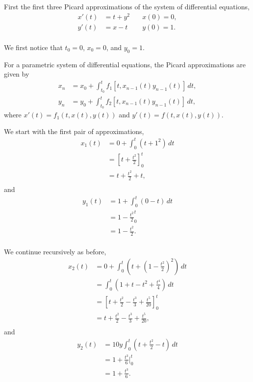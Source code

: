 \documentclass[../hw5]{subfiles}
\begin{document}
First the first three Picard approximations of the system of differential equations,
\begin{align*}
    x'(t)&=t+y^2\quad &x(0)=0, \\
    y'(t)&=x-t\quad &y(0)=1. \\
\end{align*}

We first notice that $t_0=0$, $x_0=0$, and $y_0=1$.

For a parametric system of differential equations, the Picard approximations are given by
\begin{align*}
    x_n&=x_0+\int_{t_0}^{t}f_1[t,x_{n-1}(t)y_{n-1}(t)]\,dt, \\
    y_n&=y_0+\int_{t_0}^{t}f_2[t,x_{n-1}(t)y_{n-1}(t)]\,dt,
\end{align*} 
where $x'(t)=f_1(t,x(t),y(t))$ and $y'(t)=f(t,x(t),y(t))$.

We start with the first pair of approximations,
\begin{align*}
    x_1(t)&=0+\int_{0}^{t}(t+1^2)\,dt \\
    &={\left[ t+\frac{t^2}{2} \right]}_{0}^{t} \\
    &=t+\frac{t^2}{2}+t, \\
\end{align*}
and
\begin{align*}
    y_1(t)&=1+\int_{0}^{t}(0-t)\,dt \\
    &=1-{\frac{t^2}{2}}_{0}^{t} \\
    &=1-\frac{t^2}{2}. \\
\end{align*}

We continue recursively as before, 
\begin{align*}
    x_2(t)&=0+\int_{0}^{t}\left( t+{\left( 1-\frac{t^2}{2} \right)}^2 \right)\,dt \\
    &=\int_{0}^{t} \left( 1+t-t^2+\frac{t^4}{4} \right)\,dt \\
    &= {\left[ t+\frac{t^2}{2}-\frac{t^3}{3}+\frac{t^5}{20} \right]}_{0}^{t} \\
    &= t+\frac{t^2}{2}-\frac{t^3}{3}+\frac{t^5}{20}, \\
\end{align*}
and
\begin{align*}
    y_2(t)&=10y\int_{0}^{t}\left( t+\frac{t^2}{2}-t \right)\,dt \\
    &=1+\frac{t^3}{6}\bigg\vert_{0}^{t} \\
    &=1+\frac{t^3}{6}. \\
\end{align*}
\end{document}
